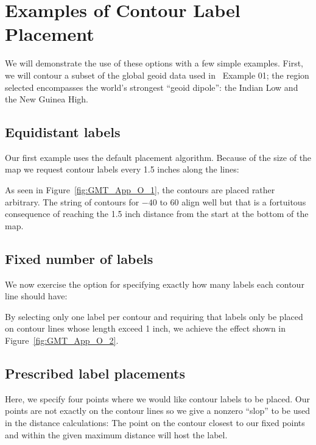 \section{Examples of Contour Label Placement}

We will demonstrate the use of these options with a few simple examples.
First, we will contour a subset of the global geoid data used in \GMT\ Example 01;
the region selected encompasses the world's strongest ``geoid dipole'': the Indian Low
and the New Guinea High.

\subsection{Equidistant labels}

Our first example uses the default placement algorithm.  Because of the size
of the map we request contour labels every 1.5 inches along the lines:


\noindent
As seen in Figure~\ref{fig:GMT_App_O_1}, the contours are placed rather arbitrary.
The string of contours for $-40$ to $60$ align well but that is a fortuitous 
consequence of reaching the 1.5 inch distance from the start at the bottom of the map.


\subsection{Fixed number of labels}

We now exercise the option for specifying exactly how many labels each contour line
should have:


\noindent
By selecting only one label per contour and requiring that labels only be placed on
contour lines whose length exceed 1 inch, we achieve the effect shown in Figure~\ref{fig:GMT_App_O_2}.


\subsection{Prescribed label placements}

Here, we specify four points where we would like contour labels to be placed.  Our points
are not exactly on the contour lines so we give a nonzero ``slop'' to be used in the
distance calculations: The point on the contour closest to our fixed points and within
the given maximum distance will host the label.

